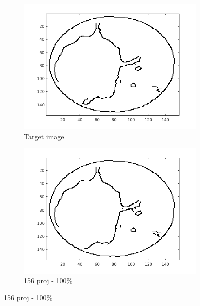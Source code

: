 \documentclass[10pt,a4paper,titlepage]{article}
\begin{document}
		\begin{figure}[H]
		
       		\centering
      		\begin{subfigure}[b]{0.32\textwidth}
            	\centering
            	\includegraphics[width=\textwidth]{Sample1/Edges/target_0_10.png}
            	\caption{Target image}    
        	\end{subfigure}
        	\begin{subfigure}[b]{0.32\textwidth}  
            	\centering 
            	\includegraphics[width=\textwidth]{Sample1/Edges/SB/fully_0_10.png}
            	\caption{156 proj - 100\%}    
            	\label{subfig:156p1L-D}
        	\end{subfigure}

\end{figure}
\end{document}
